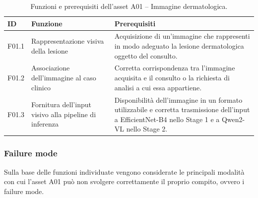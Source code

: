\begin{table}[H]
    \centering
    \small
    \setlength{\tabcolsep}{4pt}
    \renewcommand{\arraystretch}{1.08}

    \begin{tabularx}{\textwidth}{
        >{\raggedright\arraybackslash}p{1.1cm}
        >{\raggedright\arraybackslash}p{3.8cm}
        X
    }
        \toprule

        \textbf{ID} &
        \textbf{Funzione} &
        \textbf{Prerequisiti} \\

        \midrule

        F01.1 &
        Rappresentazione visiva della lesione &
        Acquisizione di un'immagine che rappresenti in modo adeguato
        la lesione dermatologica oggetto del consulto. \\

        \midrule

        F01.2 &
        Associazione dell'immagine al caso clinico &
        Corretta corrispondenza tra l'immagine acquisita e il consulto
        o la richiesta di analisi a cui essa appartiene. \\

        \midrule

        F01.3 &
        Fornitura dell'input visivo alla pipeline di inferenza &
        Disponibilità dell'immagine in un formato utilizzabile e corretta
        trasmissione dell'input a EfficientNet-B4 nello Stage 1 e a Qwen2-VL
        nello Stage 2. \\

        \bottomrule
    \end{tabularx}

    \caption{Funzioni e prerequisiti dell'asset A01 -- Immagine dermatologica.}
    \label{tab:a01-functions}
\end{table}


\subsubsection{Failure mode}

Sulla base delle funzioni individuate vengono considerate le principali
modalità con cui l'asset A01 può non svolgere correttamente il proprio
compito, ovvero i failure mode.

